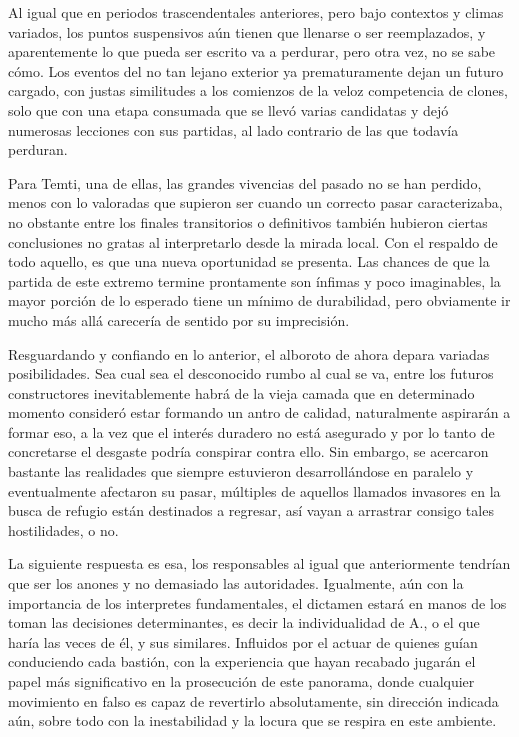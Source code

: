 \documentclass[
]{book}
\begin{document}
Al igual que en periodos trascendentales anteriores, pero bajo contextos y climas variados, los puntos suspensivos aún tienen que llenarse o ser reemplazados, y aparentemente lo que pueda ser escrito va a perdurar, pero otra vez, no se sabe cómo. Los eventos del no tan lejano exterior ya prematuramente dejan un futuro cargado, con justas similitudes a los comienzos de la veloz competencia de clones, solo que con una etapa consumada que se llevó varias candidatas y dejó numerosas lecciones con sus partidas, al lado contrario de las que todavía perduran.

Para Temti, una de ellas, las grandes vivencias del pasado no se han perdido, menos con lo valoradas que supieron ser cuando un correcto pasar caracterizaba, no obstante entre los finales transitorios o definitivos también hubieron ciertas conclusiones no gratas al interpretarlo desde la mirada local. Con el respaldo de todo aquello, es que una nueva oportunidad se presenta. Las chances de que la partida de este extremo termine prontamente son ínfimas y poco imaginables, la mayor porción de lo esperado tiene un mínimo de durabilidad, pero obviamente ir mucho más allá carecería de sentido por su imprecisión.

Resguardando y confiando en lo anterior, el alboroto de ahora depara variadas posibilidades. Sea cual sea el desconocido rumbo al cual se va, entre los futuros constructores inevitablemente habrá de la vieja camada que en determinado momento consideró estar formando un antro de calidad, naturalmente aspirarán a formar eso, a la vez que el interés duradero no está asegurado y por lo tanto de concretarse el desgaste podría conspirar contra ello. Sin embargo, se acercaron bastante las realidades que siempre estuvieron desarrollándose en paralelo y eventualmente afectaron su pasar, múltiples de aquellos llamados invasores en la busca de refugio están destinados a regresar, así vayan a arrastrar consigo tales hostilidades, o no.

La siguiente respuesta es esa, los responsables al igual que anteriormente tendrían que ser los anones y no demasiado las autoridades. Igualmente, aún con la importancia de los interpretes fundamentales, el dictamen estará en manos de los toman las decisiones determinantes, es decir la individualidad de A., o el que haría las veces de él, y sus similares. Influidos por el actuar de quienes guían conduciendo cada bastión, con la experiencia que hayan recabado jugarán el papel más significativo en la prosecución de este panorama, donde cualquier movimiento en falso es capaz de revertirlo absolutamente, sin dirección indicada aún, sobre todo con la inestabilidad y la locura que se respira en este ambiente.
\end{document}
